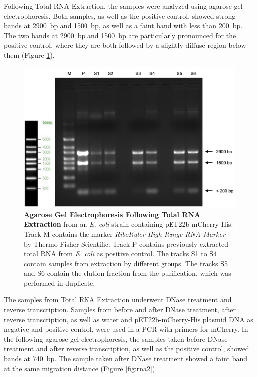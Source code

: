 \documentclass[a4paper,12pt]{article}
\begin{document}
Following Total RNA Extraction, the samples were analyzed using agarose gel electrophoresis. Both samples, as well as the positive control, showed strong bands at 2900~bp and 1500~bp, as well as a faint band with less than 200~bp. The two bands at 2900~bp and 1500~bp are particularly pronounced for the positive control, where they are both followed by a slightly diffuse region below them (Figure \ref{fig:rna1}).

\begin{figure}[h!]
    \centering
    \includegraphics[width=\textwidth]{images/rna_pre_pcr.png}
    \caption{\textbf{Agarose Gel Electrophoresis Following Total RNA Extraction} from an \emph{E. coli} strain containing pET22b-mCherry-His. Track M contains the marker \emph{RiboRuler High Range RNA Marker} by Thermo Fisher Scientific. Track P contains previously extracted total RNA from \emph{E. coli} as positive control. The tracks S1 to S4 contain samples from extraction by different groups. The tracks S5 and S6 contain the elution fraction from the purification, which was performed in duplicate. }
    \label{fig:rna1}
\end{figure}

The samples from Total RNA Extraction underwent DNase treatment and reverse transcription. Samples from before and after DNase treatment, after reverse transcription, as well as water and pET22b-mCherry-His plasmid DNA as negative and positive control, were used in a PCR with primers for mCherry. In the following agarose gel electrophoresis, the samples taken before DNase treatment and after reverse transcription, as well as the positive control, showed bands at 740~bp. The sample taken after DNase treatment showed a faint band at the same migration distance (Figure \ref{fig:rna2}).
\end{document}
